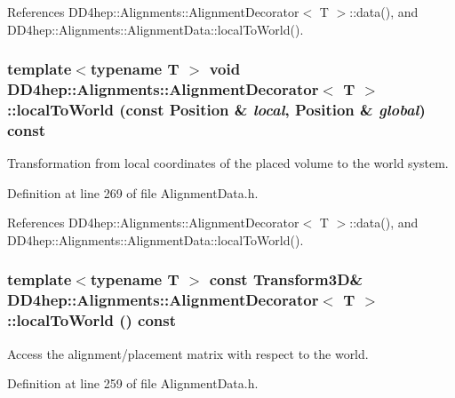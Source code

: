 References DD4hep::Alignments::AlignmentDecorator$<$ T $>$::data(), and DD4hep::Alignments::AlignmentData::localToWorld().\hypertarget{class_d_d4hep_1_1_alignments_1_1_alignment_decorator_aaa330822ce6701a70f5b1b2c11b2ec63}{
\subsubsection[{localToWorld}]{\setlength{\rightskip}{0pt plus 5cm}template$<$typename T $>$ void {\bf DD4hep::Alignments::AlignmentDecorator}$<$ {\bf T} $>$::localToWorld (const Position \& {\em local}, \/  Position \& {\em global}) const}}
\label{class_d_d4hep_1_1_alignments_1_1_alignment_decorator_aaa330822ce6701a70f5b1b2c11b2ec63}


Transformation from local coordinates of the placed volume to the world system. 

Definition at line 269 of file AlignmentData.h.

References DD4hep::Alignments::AlignmentDecorator$<$ T $>$::data(), and DD4hep::Alignments::AlignmentData::localToWorld().\hypertarget{class_d_d4hep_1_1_alignments_1_1_alignment_decorator_af88b4832207460ad2bc610342ca5b35a}{
\subsubsection[{localToWorld}]{\setlength{\rightskip}{0pt plus 5cm}template$<$typename T $>$ const Transform3D\& {\bf DD4hep::Alignments::AlignmentDecorator}$<$ {\bf T} $>$::localToWorld () const}}
\label{class_d_d4hep_1_1_alignments_1_1_alignment_decorator_af88b4832207460ad2bc610342ca5b35a}


Access the alignment/placement matrix with respect to the world. 

Definition at line 259 of file AlignmentData.h.


